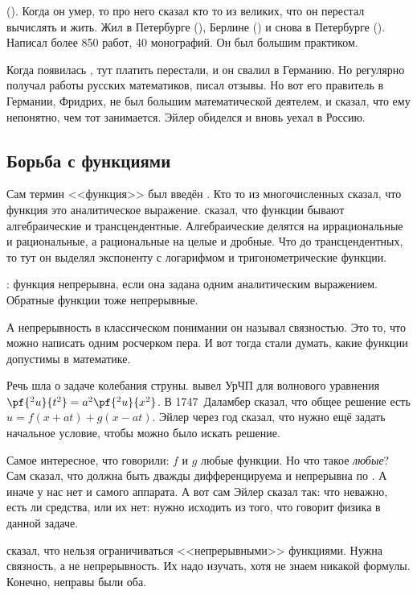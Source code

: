 \documentclass[a4paper,oneside,fleqn,10pt]{article}
\begin{document}
 (). Когда он умер, то про него сказал кто
то из великих, что он перестал вычислять и жить.  Жил в Петербурге
(), Берлине () и снова в Петербурге
().  Написал более 850 работ, 40 монографий. Он был
большим практиком.

Когда появилась , тут платить перестали, и он
свалил в Германию.  Но регулярно получал работы русских математиков,
писал отзывы. Но вот его правитель в Германии, Фридрих, не был большим
математической деятелем, и сказал, что ему непонятно, чем тот
занимается.  Эйлер обиделся и вновь уехал в Россию.

\subsection{Борьба с функциями}

Сам термин <<функция>> был введён . Кто то
из многочисленных  сказал, что функция это
аналитическое выражение.   сказал, что функции бывают
алгебраические и трансцендентные.  Алгебраические делятся на
иррациональные и рациональные, а рациональные на целые и дробные.  Что
до трансцендентных, то тут он выделял экспоненту с логарифмом и
тригонометрические функции.

: функция непрерывна, если она задана одним аналитическим
выражением.  Обратные функции тоже непрерывные.

А непрерывность в классическом понимании он называл связностью. Это
то, что можно написать одним росчерком пера. И вот тогда стали думать,
какие функции допустимы в математике.

Речь шла о задаче колебания струны.  вывел УрЧП для
волнового уравнения $\pf{^2 u}{t^2} = a^2\pf{^2u}{x^2}$.  В
1747~Даламбер сказал, что общее решение есть $u = f(x+at) +
g(x-at)$. Эйлер через год сказал, что нужно ещё задать начальное
условие, чтобы можно было искать решение.

Самое интересное, что говорили: $f$ и $g$ любые функции. Но что такое
\emph{любые}?  Сам  сказал, что должна быть дважды
дифференцируема и непрерывна по .  А иначе у нас
нет и самого аппарата. А вот сам Эйлер сказал так: что неважно, есть
ли средства, или их нет: нужно исходить из того, что говорит физика в
данной задаче.

 сказал, что нельзя ограничиваться <<непрерывными>>
функциями. Нужна связность, а не непрерывность. Их надо изучать, хотя
не знаем никакой формулы.  Конечно, неправы были оба.
\end{document}
